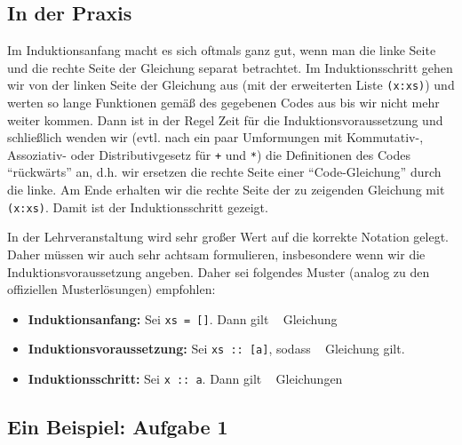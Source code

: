 \documentclass[ngerman, a4paper, 11pt]{article}
\theoremstyle{nonumberplain}
\newcommand*{\enq}[1]{\flq \ \!\!\! #1 \!\!\! \frq}
\begin{document}
\subsection*{In der Praxis}

Im Induktionsanfang macht es sich oftmals ganz gut, wenn man die linke Seite und die rechte Seite der Gleichung separat betrachtet. Im Induktionsschritt gehen wir von der linken Seite der Gleichung aus (mit der erweiterten Liste \texttt{(x:xs)}) und werten so lange Funktionen gemäß des gegebenen Codes aus bis wir nicht mehr weiter kommen. Dann ist in der Regel Zeit für die Induktionsvoraussetzung und schließlich wenden wir (evtl. nach ein paar Umformungen mit Kommutativ-, Assoziativ- oder Distributivgesetz für \texttt{+} und \texttt{*}) die Definitionen des Codes \enquote{rückwärts} an, d.h. wir ersetzen die rechte Seite einer \enquote{Code-Gleichung} durch die linke. Am Ende erhalten wir die rechte Seite der zu zeigenden Gleichung mit \texttt{(x:xs)}. Damit ist der Induktionsschritt gezeigt.

In der Lehrveranstaltung wird sehr großer Wert auf die korrekte Notation gelegt. Daher müssen wir auch sehr achtsam formulieren, insbesondere wenn wir die Induktionsvoraussetzung angeben. Daher sei folgendes Muster (analog zu den offiziellen Musterlösungen) empfohlen:
\begin{itemize}
	\item {\sffamily \bfseries Induktionsanfang:} Sei \texttt{xs = []}. Dann gilt \enq{Gleichung}
	\item {\sffamily \bfseries Induktionsvoraussetzung:} Sei \texttt{xs :: [a]}, sodass \enq{Gleichung} gilt.
	\item {\sffamily \bfseries Induktionsschritt:} Sei \texttt{x :: a}. Dann gilt \enq{Gleichungen}
\end{itemize}

\subsection*{Ein Beispiel: Aufgabe 1}
\end{document}
